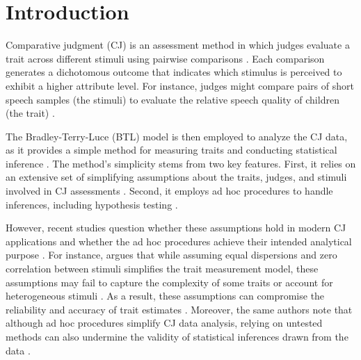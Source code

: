 \documentclass[
  authoryear,
  review,
  1p]{elsarticle}
\begin{document}
\newcommand{\dsep}{\:\bot\:}
\newcommand{\ndsep}{\:\not\bot\:}

\section{Introduction}\label{sec-introduction}

Comparative judgment (CJ) is an assessment method in which judges
evaluate a trait across different stimuli using pairwise comparisons
\citep{Thurstone_1927a, Thurstone_1927b}. Each comparison generates a
dichotomous outcome that indicates which stimulus is perceived to
exhibit a higher attribute level. For instance, judges might compare
pairs of short speech samples (the stimuli) to evaluate the relative
speech quality of children (the trait) \citep{Boonen_et_al_2020}.

The Bradley-Terry-Luce (BTL) model \citep{Bradley_et_al_1952, Luce_1959}
is then employed to analyze the CJ data, as it provides a simple method
for measuring traits and conducting statistical inference
\citep{Andrich_1978, Pollitt_2012b}. The method's simplicity stems from
two key features. First, it relies on an extensive set of simplifying
assumptions about the traits, judges, and stimuli involved in CJ
assessments \citep{Thurstone_1927b, Bramley_2008}. Second, it employs ad
hoc procedures to handle inferences, including hypothesis testing
\citep{Pollitt_2012b}.

However, recent studies question whether these assumptions hold in
modern CJ applications
\citep{Bramley_2008, Kelly_et_al_2022, Rivera_et_al_2025} and whether
the ad hoc procedures achieve their intended analytical purpose
\citep{Kelly_et_al_2022, Rivera_et_al_2025}. For instance,
\citet[pp.~2]{Rivera_et_al_2025} argues that while assuming equal
dispersions and zero correlation between stimuli simplifies the trait
measurement model, these assumptions may fail to capture the complexity
of some traits or account for heterogeneous stimuli
\citep{Thurstone_1927a, Andrich_1978, vanDaal_et_al_2016, Lesterhuis_et_al_2018, Chambers_et_al_2022}.
As a result, these assumptions can compromise the reliability and
accuracy of trait estimates
\citep{Ackerman_1989, Zimmerman_1994, McElreath_2020, Wu_et_al_2022, Miller_2023, Hoyle_et_al_2023}.
Moreover, the same authors note that although ad hoc procedures simplify
CJ data analysis, relying on untested methods can also undermine the
validity of statistical inferences drawn from the data
\citep{McElreath_2020, Kline_et_al_2023, Hoyle_et_al_2023}.
\end{document}
